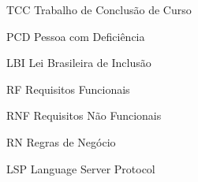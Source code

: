
\listoffigures*
\cleardoublepage



\listoftables*
\cleardoublepage

\begin{siglas}
	\item[TCC] Trabalho de Conclusão de Curso
	\item[PCD] Pessoa com Deficiência
	\item[LBI] Lei Brasileira de Inclusão
	\item[RF] Requisitos Funcionais
	\item[RNF] Requisitos Não Funcionais
	\item[RN] Regras de Negócio 
	\item[LSP] Language Server Protocol 
\end{siglas}
